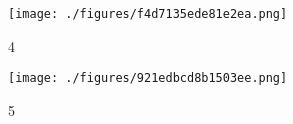 
\begin{figure}[ht]
\centering
\texttt{[image: ./figures/f4d7135ede81e2ea.png]}
\caption{4} \label{fig_test3_4}
\end{figure}

\begin{figure}[ht]
\centering
\texttt{[image: ./figures/921edbcd8b1503ee.png]}
\caption{5} \label{fig_test3_3}
\end{figure}

